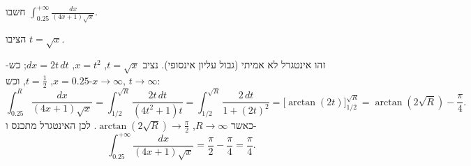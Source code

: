 
\begin{question}
חשבו $\displaystyle\int_{0.25}^{+\infty}\frac{dx}{(4x+1)\sqrt{x}}$.
\end{question}

\begin{hint}
הציבו $t=\sqrt x$.
\end{hint}

\begin{solution}
זהו אינטגרל לא אמיתי (גבול עליון אינסופי). נציב $t=\sqrt x$, $x=t^2$, $dx=2t\,dt$; כש-$x=0.25$, $t=\frac12$, וכש-$x\to\infty$, $t\to\infty$:
\[ \int_{0.25}^{R}\frac{dx}{(4x+1)\sqrt x}=\int_{1/2}^{\sqrt R}\frac{2t\,dt}{(4t^2+1)t}=\int_{1/2}^{\sqrt R}\frac{2\,dt}{1+(2t)^2}=\Big[\arctan(2t)\Big]_{1/2}^{\sqrt R}=\arctan(2\sqrt R)-\frac{\pi}{4}. \]
כאשר $R\to\infty$, $\arctan(2\sqrt R)\to\frac\pi2$. לכן האינטגרל מתכנס ו-
\[ \int_{0.25}^{+\infty}\frac{dx}{(4x+1)\sqrt{x}}=\frac\pi2-\frac\pi4=\boxed{\frac{\pi}{4}} . \]
\end{solution}
